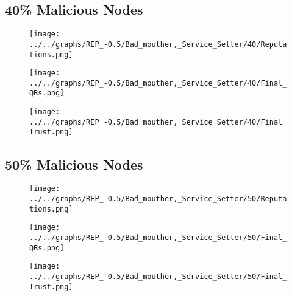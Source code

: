 \begin{minipage}[t]{0.49\columnwidth}
\subsection*{40\% Malicious Nodes}
    \begin{figure}[H]
        \centering
        \texttt{[image: ../../graphs/REP\_-0.5/Bad\_mouther,\_Service\_Setter/40/Reputations.png]}
    \end{figure}
    \begin{figure}[H]
        \centering
        \texttt{[image: ../../graphs/REP\_-0.5/Bad\_mouther,\_Service\_Setter/40/Final\_QRs.png]}
    \end{figure}
\end{minipage}
\begin{minipage}[t]{0.49\columnwidth}
    \begin{figure}[H]
        \centering
        \texttt{[image: ../../graphs/REP\_-0.5/Bad\_mouther,\_Service\_Setter/40/Final\_Trust.png]}
    \end{figure}
\end{minipage}

\begin{minipage}[t]{0.49\columnwidth}
\subsection*{50\% Malicious Nodes}
    \begin{figure}[H]
        \centering
        \texttt{[image: ../../graphs/REP\_-0.5/Bad\_mouther,\_Service\_Setter/50/Reputations.png]}
    \end{figure}
    \begin{figure}[H]
        \centering
        \texttt{[image: ../../graphs/REP\_-0.5/Bad\_mouther,\_Service\_Setter/50/Final\_QRs.png]}
    \end{figure}
\end{minipage}
\begin{minipage}[t]{0.49\columnwidth}
    \begin{figure}[H]
        \centering
        \texttt{[image: ../../graphs/REP\_-0.5/Bad\_mouther,\_Service\_Setter/50/Final\_Trust.png]}
    \end{figure}
\end{minipage}


